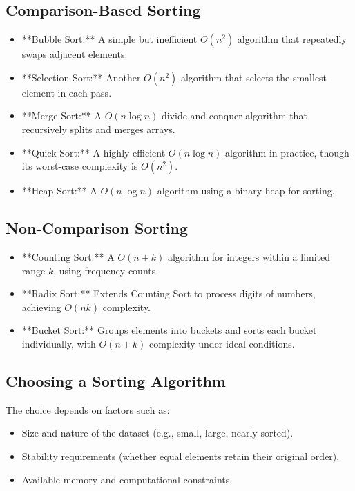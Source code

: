 \subsection*{Comparison-Based Sorting}
\begin{itemize}
    \item **Bubble Sort:** A simple but inefficient \( O(n^2) \) algorithm that repeatedly swaps adjacent elements.
    \item **Selection Sort:** Another \( O(n^2) \) algorithm that selects the smallest element in each pass.
    \item **Merge Sort:** A \( O(n \log n) \) divide-and-conquer algorithm that recursively splits and merges arrays.
    \item **Quick Sort:** A highly efficient \( O(n \log n) \) algorithm in practice, though its worst-case complexity is \( O(n^2) \).
    \item **Heap Sort:** A \( O(n \log n) \) algorithm using a binary heap for sorting.
\end{itemize}

\subsection*{Non-Comparison Sorting}
\begin{itemize}
    \item **Counting Sort:** A \( O(n + k) \) algorithm for integers within a limited range \( k \), using frequency counts.
    \item **Radix Sort:** Extends Counting Sort to process digits of numbers, achieving \( O(nk) \) complexity.
    \item **Bucket Sort:** Groups elements into buckets and sorts each bucket individually, with \( O(n + k) \) complexity under ideal conditions.
\end{itemize}

\subsection*{Choosing a Sorting Algorithm}
The choice depends on factors such as:
\begin{itemize}
    \item Size and nature of the dataset (e.g., small, large, nearly sorted).
    \item Stability requirements (whether equal elements retain their original order).
    \item Available memory and computational constraints.
\end{itemize}

